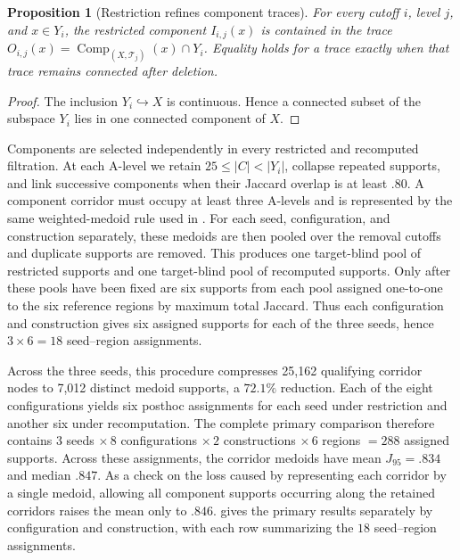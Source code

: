 \documentclass[a4paper,11pt]{article}
\newtheorem{proposition}[proposition]{Proposition}
\theoremstyle{definition}
\theoremstyle{remark}
\begin{document}
\begin{proposition}[Restriction refines component traces]
\label{prop:restriction-refines-traces}
For every cutoff $i$, level $j$, and $x\in Y_i$, the restricted component $I_{i,j}(x)$ is contained in the trace $O_{i,j}(x)=\operatorname{Comp}_{(X,\mathcal T_j)}(x)\cap Y_i$. Equality holds for a trace exactly when that trace remains connected after deletion.
\end{proposition}

\begin{proof}
The inclusion $Y_i\hookrightarrow X$ is continuous. Hence a connected subset of the subspace $Y_i$ lies in one connected component of $X$.
\end{proof}

Components are selected independently in every restricted and recomputed filtration. At each A-level we retain $25\leq|C|<|Y_i|$, collapse repeated supports, and link successive components when their Jaccard overlap is at least $.80$. A component corridor must occupy at least three A-levels and is represented by the same weighted-medoid rule used in . For each seed, configuration, and construction separately, these medoids are then pooled over the removal cutoffs and duplicate supports are removed. This produces one target-blind pool of restricted supports and one target-blind pool of recomputed supports. Only after these pools have been fixed are six supports from each pool assigned one-to-one to the six reference regions by maximum total Jaccard. Thus each configuration and construction gives six assigned supports for each of the three seeds, hence $3\times6=18$ seed–region assignments.

Across the three seeds, this procedure compresses 25,162 qualifying corridor nodes to 7,012 distinct medoid supports, a $72.1\%$ reduction. Each of the eight configurations yields six posthoc assignments for each seed under restriction and another six under recomputation. The complete primary comparison therefore contains $3$ seeds $\times\,8$ configurations $\times\,2$ constructions $\times\,6$ regions $=288$ assigned supports. Across these assignments, the corridor medoids have mean $J_{95}=.834$ and median $.847$. As a check on the loss caused by representing each corridor by a single medoid, allowing all component supports occurring along the retained corridors raises the mean only to $.846$.  gives the primary results separately by configuration and construction, with each row summarizing the $18$ seed–region assignments.
\end{document}
